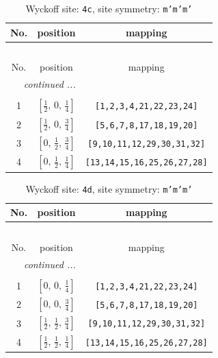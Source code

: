 \documentclass[fleqn,8pt]{jsarticle}
\begin{document}
\renewcommand{\arraystretch}{1.2}
\begin{longtable}{ccc}
\caption{Wyckoff site: {\tt 4c}, site symmetry: {\tt m'm'm'}}
 \\
 \hline \hline
No. & position & mapping \\ \hline \endfirsthead

\multicolumn{2}{l}{\tablename\ \thetable{}} \\
 \hline \hline
No. & position & mapping \\ \hline \endhead

 \hline \hline
\multicolumn{2}{r}{\footnotesize\it continued ...} \\ \endfoot

 \hline \hline
\multicolumn{2}{r}{} \\ \endlastfoot

1 & $\left[ \frac{1}{2},\, 0,\, \frac{1}{4} \right]$ & {\tt [1,2,3,4,21,22,23,24]} \\ \hline
2 & $\left[ \frac{1}{2},\, 0,\, \frac{3}{4} \right]$ & {\tt [5,6,7,8,17,18,19,20]} \\ \hline
3 & $\left[ 0,\, \frac{1}{2},\, \frac{3}{4} \right]$ & {\tt [9,10,11,12,29,30,31,32]} \\ \hline
4 & $\left[ 0,\, \frac{1}{2},\, \frac{1}{4} \right]$ & {\tt [13,14,15,16,25,26,27,28]} \\
\end{longtable}
\renewcommand{\arraystretch}{1.2}
\begin{longtable}{ccc}
\caption{Wyckoff site: {\tt 4d}, site symmetry: {\tt m'm'm'}}
 \\
 \hline \hline
No. & position & mapping \\ \hline \endfirsthead

\multicolumn{2}{l}{\tablename\ \thetable{}} \\
 \hline \hline
No. & position & mapping \\ \hline \endhead

 \hline \hline
\multicolumn{2}{r}{\footnotesize\it continued ...} \\ \endfoot

 \hline \hline
\multicolumn{2}{r}{} \\ \endlastfoot

1 & $\left[ 0,\, 0,\, \frac{1}{4} \right]$ & {\tt [1,2,3,4,21,22,23,24]} \\ \hline
2 & $\left[ 0,\, 0,\, \frac{3}{4} \right]$ & {\tt [5,6,7,8,17,18,19,20]} \\ \hline
3 & $\left[ \frac{1}{2},\, \frac{1}{2},\, \frac{3}{4} \right]$ & {\tt [9,10,11,12,29,30,31,32]} \\ \hline
4 & $\left[ \frac{1}{2},\, \frac{1}{2},\, \frac{1}{4} \right]$ & {\tt [13,14,15,16,25,26,27,28]} \\
\end{longtable}
\end{document}
